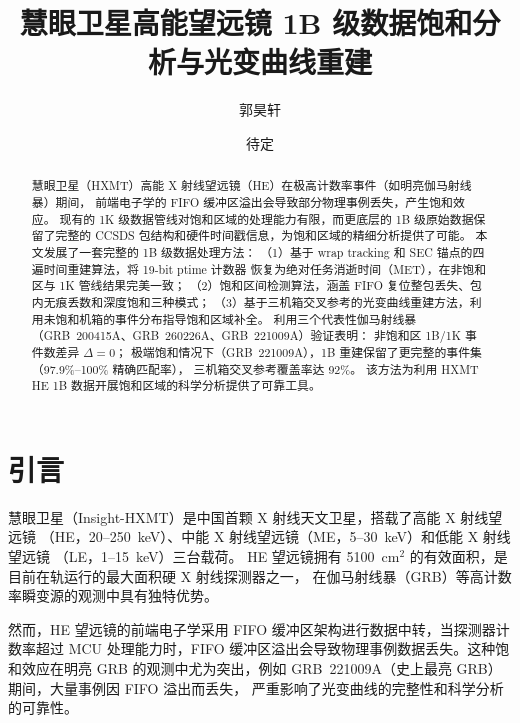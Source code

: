 \documentclass[aps,prd,twocolumn,nofootinbib,superscriptaddress]{revtex4-2}
\begin{document}
\title{慧眼卫星高能望远镜 1B 级数据饱和分析与光变曲线重建}

\author{郭昊轩}

\author{待定}

\begin{abstract}
慧眼卫星（HXMT）高能 X 射线望远镜（HE）在极高计数率事件（如明亮伽马射线暴）期间，
前端电子学的 FIFO 缓冲区溢出会导致部分物理事例丢失，产生饱和效应。
现有的 1K 级数据管线对饱和区域的处理能力有限，而更底层的 1B 级原始数据保留了完整的
CCSDS 包结构和硬件时间戳信息，为饱和区域的精细分析提供了可能。
本文发展了一套完整的 1B 级数据处理方法：
（1）基于 wrap tracking 和 SEC 锚点的四遍时间重建算法，将 19-bit ptime 计数器
恢复为绝对任务消逝时间（MET），在非饱和区与 1K 管线结果完美一致；
（2）饱和区间检测算法，涵盖 FIFO 复位整包丢失、包内无痕丢数和深度饱和三种模式；
（3）基于三机箱交叉参考的光变曲线重建方法，利用未饱和机箱的事件分布指导饱和区域补全。
利用三个代表性伽马射线暴（GRB~200415A、GRB~260226A、GRB~221009A）验证表明：
非饱和区 1B/1K 事件数差异 $\Delta = 0$；
极端饱和情况下（GRB~221009A），1B 重建保留了更完整的事件集（97.9\%--100\% 精确匹配率），
三机箱交叉参考覆盖率达 92\%。
该方法为利用 HXMT HE 1B 数据开展饱和区域的科学分析提供了可靠工具。
\end{abstract}

\maketitle

\section{引言}\label{sec:intro}

慧眼卫星（Insight-HXMT）是中国首颗 X 射线天文卫星，搭载了高能 X 射线望远镜
（HE，20--250~keV）、中能 X 射线望远镜（ME，5--30~keV）和低能 X 射线望远镜
（LE，1--15~keV）三台载荷。
HE 望远镜拥有 5100~cm$^2$ 的有效面积，是目前在轨运行的最大面积硬 X 射线探测器之一，
在伽马射线暴（GRB）等高计数率瞬变源的观测中具有独特优势。

然而，HE 望远镜的前端电子学采用 FIFO 缓冲区架构进行数据中转，当探测器计数率超过
MCU 处理能力时，FIFO 缓冲区溢出会导致物理事例数据丢失。这种饱和效应在明亮 GRB
的观测中尤为突出，例如 GRB~221009A（史上最亮 GRB）期间，大量事例因 FIFO 溢出而丢失，
严重影响了光变曲线的完整性和科学分析的可靠性。
\end{document}
